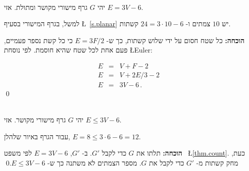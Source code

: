 \begin{center}

\end{center}
\begin{theorem}\mbox{}\\
יהי
$G$
גרף מישורי מקושר ומתולת. אזי
$E= 3V-6$.
\end{theorem}
למשל, בגרף המישורי בסעיף
\L{~\ref{s.planar}}
יש
$10$
צמתים ו-%
$24= 3\cdot 10-6$
קשתות.

\textbf{הוכחה:}
כל שטח חסום על ידי שלוש קשתות, כך ש-%
$E=3F/2$
כי כל קשת נספר פעמיים, פעם אחת לכל שטח שהיא חוסמת. לפי נוסחת
\L{Euler}:

\begin{eqnarray*}
E&=&V+F-2\\
E&=&V+2E/3-2\\
E&=&3V-6\,.
\end{eqnarray*}\qed

\begin{theorem}\label{thm.count}\mbox{}\\
יהי
$G$
גרף מישורי מקושר. אזי
$E\leq 3V-6$.
\end{theorem}
עבור הגרף באיור שלהלן,
$E=8\leq 3\cdot 6 - 6= 12$.

\begin{center}

\end{center}

\textbf{הוכחה:}
תלתו את
$G$
כדי לקבל
$G'$.
ב-%
$G'$, $E= 3V-6$
לפי משפט~%
\L{\ref{thm.count}}.
כעת, מחק קשתות מ-%
$G'$
כדי לקבל את
$G$.
מספר הצמתים לא משתנה כך ש-%
$E\leq 3V-6$.\qed

